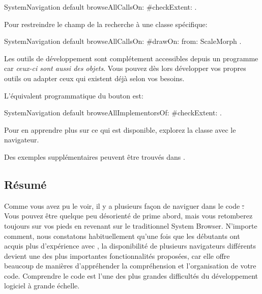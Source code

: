 \documentclass[a4paper,10pt,twoside]{book}
\begin{document}

\begin{code}{}
SystemNavigation default browseAllCallsOn: #checkExtent: .
\end{code}
Pour restreindre le champ de la recherche \`a une classe sp\'ecifique:
\begin{code}{}
SystemNavigation default browseAllCallsOn: #drawOn: from: ScaleMorph .
\end{code}
Les outils de d\'eveloppement sont compl\'etement accessibles depuis un
programme car \emph{ceux-ci sont aussi des objets}. Vous pouvez d\`es lors
d\'evelopper vos propres outils ou adapter ceux qui existent d\'ej\`a
selon vos besoins.

L'\'equivalent programmatique du bouton  est:
\begin{code}{}
SystemNavigation default browseAllImplementorsOf: #checkExtent: .
\end{code}

Pour en apprendre plus sur ce qui est disponible, explorez la classe
 avec le navigateur.

Des exemples suppl\'ementaires peuvent \^etre trouv\'es dans
 .


\subsection{R\'esum\'e}

Comme vous avez pu le voir, il y a plusieurs fa\c{c}on de naviguer
dans le code \st.
Vous pouvez \^etre quelque peu d\'esorient\'e de prime abord, mais
vous retomberez toujours sur vos pieds en revenant sur le 
traditionnel System Browser.
N'importe comment, nous constatons habituellement qu'une fois que les
d\'ebutants ont acquis plus d'exp\'erience avec \sq, la disponibilit\'e
de plusieurs navigateurs diff\'erents devient une des plus
importantes fonctionnalit\'es propos\'ees, car elle offre beaucoup de
mani\`eres d'appr\'ehender la compr\'ehension et l'organisation de votre
code.
Comprendre le code est l'une des plus grandes difficult\'es du d\'eveloppement
logiciel \`a grande \'echelle.
\end{document}
